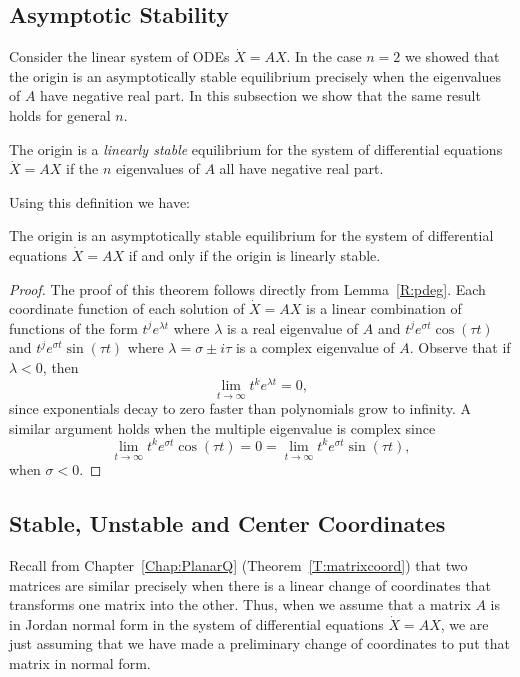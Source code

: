 \documentclass{ximera}
\begin{document}
\subsection*{Asymptotic Stability}


Consider the linear system of ODEs $\dot{X}=AX$.  In the case $n=2$ we showed 
that the origin is an asymptotically stable equilibrium precisely when the 
eigenvalues of $A$ have negative real part.  In this subsection we show that the 
same result holds for general $n$. 
\begin{Def}  \label{D:linstab}
The origin is a {\em linearly stable\/} equilibrium for the system 
of differential equations $\dot{X}=AX$ if the $n$ eigenvalues of $A$ 
all have negative real part.  
\end{Def}
Using this definition we have:
\begin{thm}  \label{T:linstab}
The origin is an asymptotically stable equilibrium for the system of 
differential equations $\dot{X}=AX$ if and only if the origin is linearly stable.
\end{thm}

\begin{proof} The proof of this theorem follows directly from Lemma~\ref{R:pdeg}.
Each coordinate function of each solution of $\dot{X}=AX$ is a linear 
combination of functions of the form $t^je^{\lambda t}$ where $\lambda$ is 
a real eigenvalue of $A$ and $t^je^{\sigma t}\cos(\tau t)$ and 
$t^je^{\sigma t}\sin(\tau t)$ where $\lambda=\sigma\pm i\tau$ is a complex
eigenvalue of $A$.  Observe that if $\lambda < 0$, then
\[
\lim_{t\to\infty}t^ke^{\lambda t} = 0,
\]
since exponentials decay to zero faster than 
polynomials grow to infinity.  A similar argument holds when the multiple 
eigenvalue is complex since 
\[
\lim_{t\to\infty}t^ke^{\sigma t}\cos(\tau t) = 0 = 
\lim_{t\to\infty}t^ke^{\sigma t}\sin(\tau t),
\]
when $\sigma < 0$.  \end{proof}

\subsection*{Stable, Unstable and Center Coordinates}

Recall from Chapter~\ref{Chap:PlanarQ} (Theorem~\ref{T:matrixcoord}) that 
two matrices are similar 
precisely when there is a linear change of 
coordinates that transforms
one matrix into the other.  Thus, when we assume that a matrix $A$ is in 
Jordan normal form in the system of differential 
equations $\dot{X}=AX$, 
we are just assuming that we have made a preliminary change of coordinates
to put that matrix in normal form. 
\end{document}

